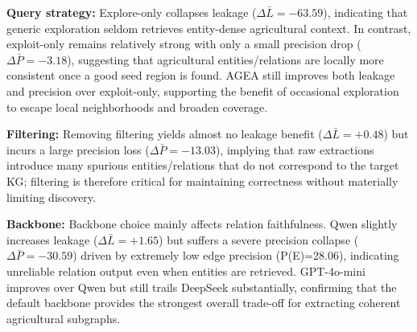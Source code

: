 
\noindent\textbf{Query strategy:} Explore-only collapses leakage ($\Delta\bar{L}{=}-63.59$), indicating that generic exploration seldom retrieves entity-dense agricultural context. In contrast, exploit-only remains relatively strong with only a small precision drop ($\Delta\bar{P}{=}-3.18$), suggesting that agricultural entities/relations are locally more consistent once a good seed region is found. AGEA still improves both leakage and precision over exploit-only, supporting the benefit of occasional exploration to escape local neighborhoods and broaden coverage.

\noindent\textbf{Filtering:} Removing filtering yields almost no leakage benefit ($\Delta\bar{L}{=}+0.48$) but incurs a large precision loss ($\Delta\bar{P}{=}-13.03$), implying that raw extractions introduce many spurious entities/relations that do not correspond to the target KG; filtering is therefore critical for maintaining correctness without materially limiting discovery.

\noindent\textbf{Backbone:} Backbone choice mainly affects relation faithfulness. Qwen slightly increases leakage ($\Delta\bar{L}{=}+1.65$) but suffers a severe precision collapse ($\Delta\bar{P}{=}-30.59$) driven by extremely low edge precision (P(E)=28.06), indicating unreliable relation output even when entities are retrieved. GPT-4o-mini improves over Qwen but still trails DeepSeek substantially, confirming that the default backbone provides the strongest overall trade-off for extracting coherent agricultural subgraphs.

